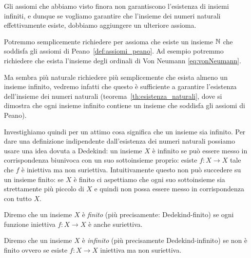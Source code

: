 Gli assiomi che abbiamo visto finora non garantiscono l'esistenza di insiemi infiniti, e dunque se 
vogliamo garantire che l'insieme dei numeri naturali effettivamente esiste, 
dobbiamo aggiungere un ulteriore assioma. 

Potremmo semplicemente richiedere per assioma che esiste un insieme ${\mathbb N}$ che soddisfa gli assiomi
di Peano~\ref{def:assiomi_peano}.
Ad esempio potremmo richiedere 
che esista l'insieme degli ordinali di Von Neumann \eqref{eq:vonNeumann}. 

Ma sembra più naturale richiedere più semplicemente che esista almeno un insieme infinito,
vedremo infatti che questo è sufficiente a garantire l'esistenza dell'insieme dei numeri naturali
(teorema~\ref{th:esistenza_naturali}, dove si dimostra che ogni insieme infinito contiene un insieme 
che soddisfa gli assiomi di Peano).

Investighiamo quindi per un attimo cosa significa che un insieme sia infinito.
Per dare una definizione indipendente dall'esistenza dei numeri naturali possiamo usare 
una idea dovuta a Dedekind:
un insieme $X$ è infinito se può essere messo in corrispondenza 
biunivoca con un suo sottoinsieme proprio: 
esiste $f\colon X\to X$ tale che $f$ è iniettiva ma non suriettiva. 
Intuitivamente questo non può succedere su un insieme finito: 
se $X$ è finito ci aspettiamo che ogni suo sottoinsieme sia strettamente più piccolo di $X$
e quindi non possa essere messo in corrispondenza con tutto $X$.

\begin{definition}
  \label{def:infinito}%
  Diremo che un insieme $X$ è \emph{finito}
  (più precisamente: Dedekind-finito)
  se ogni funzione iniettiva $f\colon X\to X$ è anche suriettiva.
%

  Diremo che un insieme $X$ è \emph{infinito} 
  (più precisamente Dedekind-infinito)
  se non è finito ovvero
  se esiste $f\colon X\to X$ iniettiva ma non suriettiva.
%
\end{definition}

